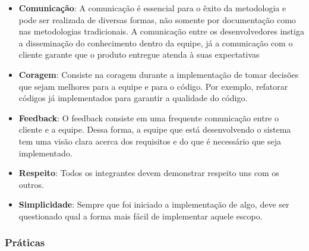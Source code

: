 \begin{itemize}
  \item \textbf{Comunicação}: A comunicação é essencial para o êxito da metodologia e pode ser realizada de diversas formas, não somente por documentação como nas metodologias tradicionais. A comunicação entre os desenvolvedores instiga a disseminação do conhecimento dentro da equipe, já a comunicação com o cliente garante que o produto entregue atenda à suas expectativas
  \item \textbf{Coragem}: Consiste na coragem durante a implementação de tomar decisões que sejam melhores para a equipe e para o código. Por exemplo, refatorar códigos já implementados para garantir a qualidade do código.
  \item \textbf{Feedback}: O feedback consiste em uma frequente comunicação entre o cliente e a equipe. Dessa forma, a equipe que está desenvolvendo o sistema tem uma visão clara acerca dos requisitos e do que é necessário que seja implementado.
  \item \textbf{Respeito}: Todos os integrantes devem demonstrar respeito uns com os outros.
  \item \textbf{Simplicidade}: Sempre que foi iniciado a implementação de algo, deve ser questionado qual a forma mais fácil de implementar aquele escopo.
\end{itemize}

\subsubsection{Práticas}

